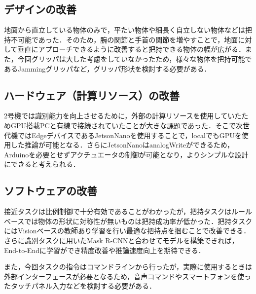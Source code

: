 \subsection*{デザインの改善}
地面から直立している物体のみで，平たい物体や細長く自立しない物体などは把持不可能であった．そのため，腕の関節と手首の関節を増やすことで，地面に対して垂直にアプローチできるように改善すると把持できる物体の幅が広がる．また，今回グリッパは大した考慮をしていなかったため，様々な物体を把持可能であるJammingグリッパ\cite{jamminggripper}など，グリッパ形状を検討する必要がある．

\subsection*{ハードウェア（計算リソース）の改善}
2号機では識別能力を向上させるために，外部の計算リソースを使用していたためGPU搭載PCと有線で接続されていたことが大きな課題であった．そこで次世代機ではEdgeデバイスであるJetsonNanoを使用することで，localでもGPUを使用した推論が可能となる．さらにJetsonNanoはanalogWriteができるため，Arduinoを必要とせずアクチュエータの制御が可能となり，よりシンプルな設計にできると考えられる．

\subsection*{ソフトウェアの改善}
接近タスクは比例制御で十分有効であることがわかったが，把持タスクはルールベースでは物体の形状に対称性が無いものは把持成功率が低かった．把持タスクにはVisionベースの教師あり学習を行い最適な把持点を掴むことで改善できる．さらに識別タスクに用いたMask R-CNNと合わせてモデルを構築できれば，End-to-Endに学習ができ精度改善や推論速度向上を期待できる．

また，今回タスクの指令はコマンドラインから行ったが，実際に使用するときは外部インターフェースが必要となるため，音声コマンドやスマートフォンを使ったタッチパネル入力などを検討する必要がある．
